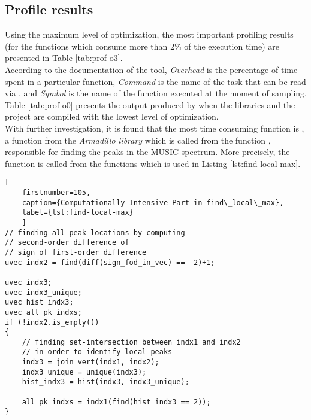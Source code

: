 \subsection{Profile results}

Using the maximum level of optimization, the most important profiling results
(for the functions which consume more than 2\% of the execution time) are
presented in Table \ref{tab:prof-o3}. \\



According to the documentation of the tool, \textit{Overhead} is the percentage
of time spent in a particular function, \textit{Command} is the name of the task
that can be read via , and \textit{Symbol} is the name of
the function executed at the moment of sampling. \\

Table \ref{tab:prof-o0} presents the output produced by  when
the libraries and the project are compiled with the lowest level of
optimization. \\



With further investigation, it is found that the most time consuming function is
 , a function from
the \textit{Armadillo library} which is called from the function
, responsible for finding the peaks in the MUSIC
spectrum. More precisely, the function is called from the  functions
which is used in Listing \ref{lst:find-local-max}. \\

\begin{minipage}{\linewidth}
\begin{lstlisting}[
	firstnumber=105,
	caption={Computationally Intensive Part in find\_local\_max},
	label={lst:find-local-max}
    ]
// finding all peak locations by computing
// second-order difference of
// sign of first-order difference
uvec indx2 = find(diff(sign_fod_in_vec) == -2)+1;

uvec indx3;
uvec indx3_unique;
uvec hist_indx3;
uvec all_pk_indxs;
if (!indx2.is_empty())
{
    // finding set-intersection between indx1 and indx2
    // in order to identify local peaks
    indx3 = join_vert(indx1, indx2);
    indx3_unique = unique(indx3);
    hist_indx3 = hist(indx3, indx3_unique);

    all_pk_indxs = indx1(find(hist_indx3 == 2));
}
\end{lstlisting}
\end{minipage}

